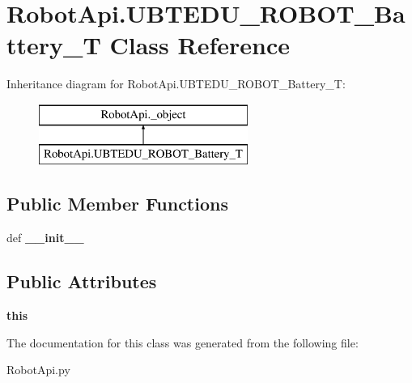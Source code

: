 \hypertarget{classRobotApi_1_1UBTEDU__ROBOT__Battery__T}{\section{Robot\+Api.\+U\+B\+T\+E\+D\+U\+\_\+\+R\+O\+B\+O\+T\+\_\+\+Battery\+\_\+\+T Class Reference}
\label{classRobotApi_1_1UBTEDU__ROBOT__Battery__T}
}
Inheritance diagram for Robot\+Api.\+U\+B\+T\+E\+D\+U\+\_\+\+R\+O\+B\+O\+T\+\_\+\+Battery\+\_\+\+T\+:\begin{figure}[H]
\begin{center}
\leavevmode
\includegraphics[height=2.000000cm]{classRobotApi_1_1UBTEDU__ROBOT__Battery__T}
\end{center}
\end{figure}
\subsection*{Public Member Functions}
\begin{DoxyCompactItemize}
\item 
\hypertarget{classRobotApi_1_1UBTEDU__ROBOT__Battery__T_a6696b4924b64f4d15dcc4d080af4e63c}{def {\bfseries \+\_\+\+\_\+init\+\_\+\+\_\+}}\label{classRobotApi_1_1UBTEDU__ROBOT__Battery__T_a6696b4924b64f4d15dcc4d080af4e63c}

\end{DoxyCompactItemize}
\subsection*{Public Attributes}
\begin{DoxyCompactItemize}
\item 
\hypertarget{classRobotApi_1_1UBTEDU__ROBOT__Battery__T_a79ac9be20b2d864afb186cd79d6e9ad6}{{\bfseries this}}\label{classRobotApi_1_1UBTEDU__ROBOT__Battery__T_a79ac9be20b2d864afb186cd79d6e9ad6}

\end{DoxyCompactItemize}


The documentation for this class was generated from the following file\+:\begin{DoxyCompactItemize}
\item 
Robot\+Api.\+py\end{DoxyCompactItemize}
